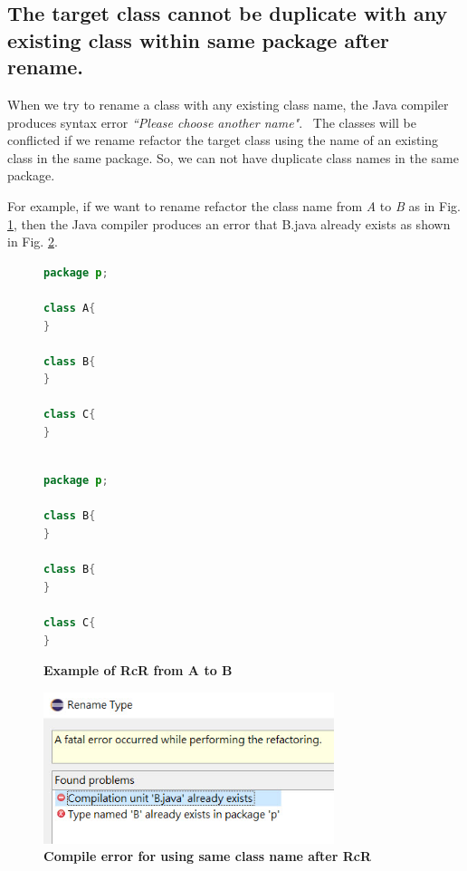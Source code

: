 \subsection{The target class cannot be duplicate with any existing class within same package after rename.}

When we try to rename a class with any existing class name, the Java compiler produces syntax error \textit{``Please choose another name"}.~\cite{EclipseWebPage} The classes will be conflicted if we rename refactor the target class using the name of an existing class in the same package. So, we can not have duplicate class names in the same package. 

For example, if we want to rename refactor the class name from \textsl{A} to \textsl{B} as in Fig. \ref{fig:afterrr}, then the Java compiler produces an error that B.java already exists as shown in Fig. \ref{fig:renameclassname}.

\begin{figure}[th]
\centering
\begin{minipage}[t]{0.45\linewidth}
\begin{lstlisting}[language=java, basicstyle=\scriptsize\ttfamily,frame=single]
package p;

class A{
}
	
class B{
}

class C{
}
 
\end{lstlisting}
\end{minipage}
\hfill
\begin{minipage}[t]{0.45\linewidth}
\begin{lstlisting}[language=java, basicstyle=\scriptsize\ttfamily,frame=single]
package p;

class B{
}	

class B{
}

class C{
}

\end{lstlisting}
\end{minipage}
\caption{\textbf{Example of RcR from A to B}}
\label{fig:afterrr}
\end{figure}

\begin{figure}[H]
\centerline{\includegraphics[width=85mm,scale=0.5]{SCN.jpg}}
\caption{\textbf{Compile error for using same class name after RcR}}
\label{fig:renameclassname}
\end{figure}

